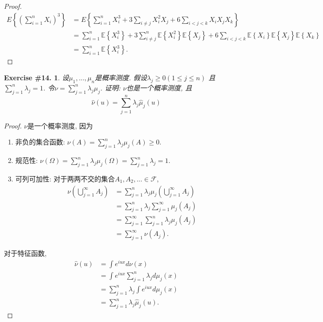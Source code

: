 \documentclass[UTF8, a4paper]{article}
\newtheorem{exercise}{Exercise \#14.}
\begin{document}
\begin{proof}
$$
\begin{aligned}
    E\left\{\left(\sum_{i=1}^n X_i\right)^3\right\} &= E\left\{\sum_{i=1}^n X_i^3 + 3\sum_{i\neq j} X_i^2 X_j + 6\sum_{i<j<k} X_i X_j X_k\right\} \\
    &= \sum_{i=1}^n \mathbb{E}\left\{X_i^3\right\} + 3\sum_{i\neq j}^n \mathbb{E}\left\{X_i^2\right\}\mathbb{E}\left\{X_j\right\} + 6\sum_{i<j<k} \mathbb{E}\left\{X_i\right\}\mathbb{E}\left\{X_j\right\}\mathbb{E}\left\{X_k\right\} \\
    &= \sum_{i=1}^n \mathbb{E}\left\{X_i^3\right\}.
\end{aligned}
$$
\end{proof}



\begin{framed}
\begin{exercise}
设\(\mu_1, ..., \mu_n\)是概率测度. 假设\(\lambda_j \geq 0(1 \leq j \leq n)\)
且\(\sum_{j=1}^n \lambda_j = 1\). 
令\(\nu = \sum_{j = 1}^{n}\lambda_j \mu_j\).
证明: \(\nu\)也是一个概率测度, 且
$$
\hat{\nu}(u)=\sum_{j=1}^n \lambda_j \hat{\mu}_j(u)
$$
\end{exercise}
\end{framed}

\begin{proof}
\(\nu\)是一个概率测度, 因为
\begin{enumerate}
    \item 非负的集合函数: \(\nu(A) = \sum_{j=1}^n \lambda_j \mu_j(A) \geq 0\).
    \item 规范性: \(\nu(\Omega) = \sum_{j=1}^n \lambda_j \mu_j(\Omega) = \sum_{j=1}^n \lambda_j = 1\).
    \item 可列可加性: 对于两两不交的集合\(A_1, A_2, ... \in \mathscr{F}\),
    $$\begin{aligned}
        \nu\left(\bigcup_{j=1}^{\infty} A_j\right) &= \sum_{j=1}^n \lambda_j \mu_j\left(\bigcup_{j=1}^{\infty} A_j\right) \\
        &= \sum_{j=1}^n \lambda_j \sum_{j=1}^{\infty} \mu_j(A_j) \\
        &= \sum_{j=1}^{\infty} \sum_{j=1}^n \lambda_j \mu_j(A_j) \\
        &= \sum_{j=1}^{\infty} \nu(A_j).
    \end{aligned}$$
\end{enumerate}

对于特征函数,
$$
\begin{aligned}
    \hat{\nu}(u) &= \int e^{iux} d\nu(x) \\
    &= \int e^{iux} \sum_{j=1}^n \lambda_j d\mu_j(x) \\
    &= \sum_{j=1}^n \lambda_j \int e^{iux} d\mu_j(x) \\
    &= \sum_{j=1}^n \lambda_j \hat{\mu}_j(u).
\end{aligned}
$$
\end{proof}
\end{document}

